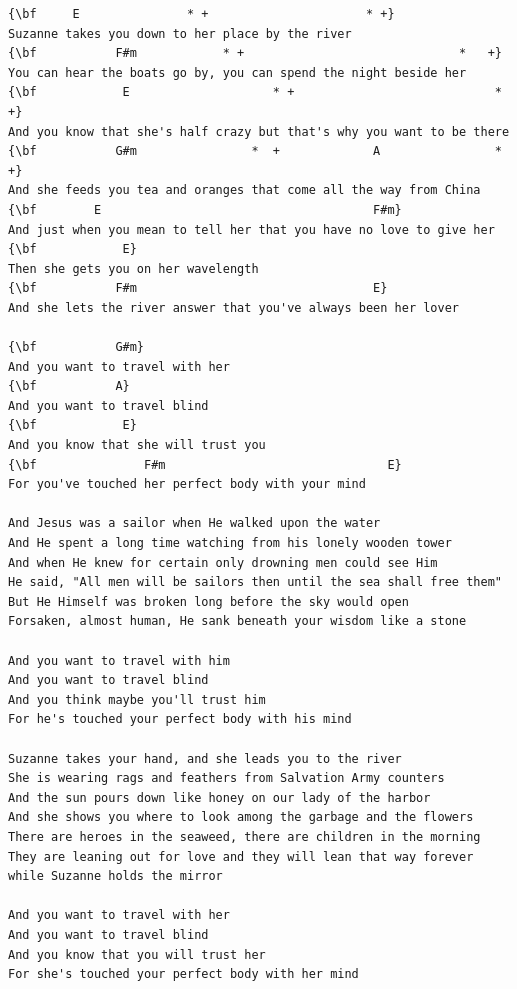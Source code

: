 \documentclass[a4paper]{article}
\begin{document}
\begin{Verbatim}[commandchars=\\\{\}]
{\bf     E               * +                      * +}
Suzanne takes you down to her place by the river
{\bf           F#m            * +                              *   +}
You can hear the boats go by, you can spend the night beside her
{\bf            E                    * +                            *    +}
And you know that she's half crazy but that's why you want to be there
{\bf           G#m                *  +             A                * +}
And she feeds you tea and oranges that come all the way from China
{\bf        E                                      F#m}
And just when you mean to tell her that you have no love to give her
{\bf            E}
Then she gets you on her wavelength
{\bf           F#m                                 E}
And she lets the river answer that you've always been her lover

{\bf           G#m}
And you want to travel with her
{\bf           A}
And you want to travel blind
{\bf            E}
And you know that she will trust you
{\bf               F#m                               E}
For you've touched her perfect body with your mind 

And Jesus was a sailor when He walked upon the water 
And He spent a long time watching from his lonely wooden tower
And when He knew for certain only drowning men could see Him 
He said, "All men will be sailors then until the sea shall free them"
But He Himself was broken long before the sky would open
Forsaken, almost human, He sank beneath your wisdom like a stone 

And you want to travel with him
And you want to travel blind
And you think maybe you'll trust him
For he's touched your perfect body with his mind 

Suzanne takes your hand, and she leads you to the river   
She is wearing rags and feathers from Salvation Army counters
And the sun pours down like honey on our lady of the harbor 
And she shows you where to look among the garbage and the flowers
There are heroes in the seaweed, there are children in the morning    
They are leaning out for love and they will lean that way forever   
while Suzanne holds the mirror 

And you want to travel with her
And you want to travel blind
And you know that you will trust her
For she's touched your perfect body with her mind

\end{Verbatim}
\newpage
\end{document}
